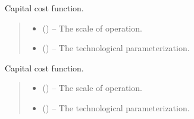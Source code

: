 \documentclass[letterpaper,10pt,english]{sphinxmanual}
\begin{document}
\begin{fulllineitems}
\label{\detokenize{technology:technology.transport_model.capital_cost}}
\pysigstartsignatures
{}
\pysigstopsignatures
\sphinxAtStartPar
Capital cost function.
\begin{quote}\begin{description}
\begin{itemize}
\item {} 
\sphinxAtStartPar
{} () – The scale of operation.

\item {} 
\sphinxAtStartPar
{} () – The technological parameterization.

\end{itemize}

\end{description}\end{quote}

\end{fulllineitems}


\begin{fulllineitems}
\label{\detokenize{technology:technology.transport_model.fixed_cost}}
\pysigstartsignatures
{}
\pysigstopsignatures
\sphinxAtStartPar
Capital cost function.
\begin{quote}\begin{description}
\begin{itemize}
\item {} 
\sphinxAtStartPar
{} () – The scale of operation.

\item {} 
\sphinxAtStartPar
{} () – The technological parameterization.

\end{itemize}

\end{description}\end{quote}

\end{fulllineitems}
\end{document}
